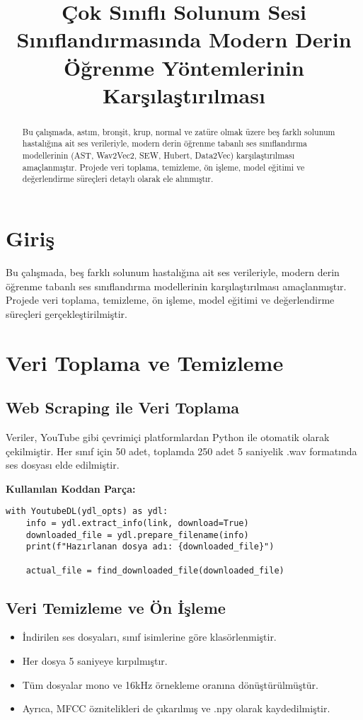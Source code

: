 \documentclass[conference]{IEEEtran}
\title{Çok Sınıflı Solunum Sesi Sınıflandırmasında Modern Derin Öğrenme Yöntemlerinin Karşılaştırılması}
\author{
    \IEEEauthorblockN{İbrahim Buğra San}
    \IEEEauthorblockA{
        Kocaeli Üniversitesi / Bilişim Sistemleri Mühendisliği\\
        221307059\\
        ibugrasan@gmail.com
    }
}
\begin{document}
\maketitle

\begin{abstract}
Bu çalışmada, astım, bronşit, krup, normal ve zatüre olmak üzere beş farklı solunum hastalığına ait ses verileriyle, modern derin öğrenme tabanlı ses sınıflandırma modellerinin (AST, Wav2Vec2, SEW, Hubert, Data2Vec) karşılaştırılması amaçlanmıştır. Projede veri toplama, temizleme, ön işleme, model eğitimi ve değerlendirme süreçleri detaylı olarak ele alınmıştır.
\end{abstract}

\section{Giriş}
Bu çalışmada, beş farklı solunum hastalığına ait ses verileriyle, modern derin öğrenme tabanlı ses sınıflandırma modellerinin karşılaştırılması amaçlanmıştır. Projede veri toplama, temizleme, ön işleme, model eğitimi ve değerlendirme süreçleri gerçekleştirilmiştir.

\section{Veri Toplama ve Temizleme}

\subsection{Web Scraping ile Veri Toplama}
Veriler, YouTube gibi çevrimiçi platformlardan Python ile otomatik olarak çekilmiştir. Her sınıf için 50 adet, toplamda 250 adet 5 saniyelik .wav formatında ses dosyası elde edilmiştir.

\textbf{Kullanılan Koddan Parça:}
\begin{lstlisting}
with YoutubeDL(ydl_opts) as ydl:
    info = ydl.extract_info(link, download=True)
    downloaded_file = ydl.prepare_filename(info)
    print(f"Hazırlanan dosya adı: {downloaded_file}")
    
    actual_file = find_downloaded_file(downloaded_file)
\end{lstlisting}

\subsection{Veri Temizleme ve Ön İşleme}
\begin{itemize}
    \item İndirilen ses dosyaları, sınıf isimlerine göre klasörlenmiştir.
    \item Her dosya 5 saniyeye kırpılmıştır.
    \item Tüm dosyalar mono ve 16kHz örnekleme oranına dönüştürülmüştür.
    \item Ayrıca, MFCC öznitelikleri de çıkarılmış ve .npy olarak kaydedilmiştir.
\end{itemize}
\end{document}
